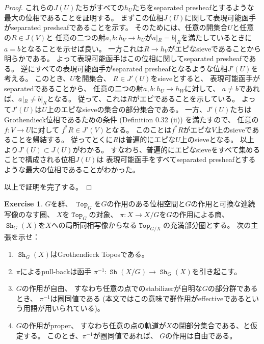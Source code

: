 \documentclass[uplatex]{jsarticle}
\theoremstyle{definition}
\newtheorem{prob}[prob]{Exercise}
\DeclareMathOperator{\sfTop}{\mathtt{Top}}
\DeclareMathOperator{\Sh}{\mathtt{Sh}}
\begin{document}
\begin{proof}
  これらの\(J(U)\)たちがすべての\(h_U\)たちをseparated presheafとするような
  最大の位相であることを証明する。
  まずこの位相\(J(U)\)に関して表現可能函手がseparated presheafであることを示す。
  そのためには、任意の開集合\(U\)と任意の\(R\in J(V)\)と
  任意の二つの射\(a,b:h_V\to h_U\)が\(a|_R = b|_R\)を満たしているときに
  \(a=b\)となることを示せば良い。
  一方これは\(R\to h_V\)がエピなsieveであることから明らかである。
  よって表現可能函手はこの位相に関してseparated presheafである。
  逆にすべての表現可能函手がseparated presheafとなるような位相\(J'(U)\)を考える。
  このとき、\(U\)を開集合、
  \(R\in J'(U)\)をsieveとすると、
  表現可能函手がseparatedであることから、
  任意の二つの射\(a,b:h_U\to h_W\)に対して、
  \(a\neq b\)であれば、\(a|_R\neq b|_R\)となる。
  従って、これは\(R\)がエピであることを示している。
  よって\(J'(U)\)は\(U\)上のエピなsieveの集合の部分集合である。
  一方、\(J'(U)\)たちは
  Grothendieck位相であるための条件 (Definition 0.32 (ii)) を満たすので、
  任意の\(f:V\to U\)に対して
  \(f^*R\in J'(V)\)となる。
  このことは\(f^*R\)がエピな\(V\)上のsieveであることを帰結する。
  従ってとくに\(R\)は普遍的にエピな\(U\)上のsieveとなる。
  以上より\(J'(U)\subset J(U)\)がわかる。
  すなわち、普遍的にエピなsieveをすべて集めることで構成される位相\(J(U)\)は
  表現可能函手をすべてseparated presheafとするような最大の位相であることがわかった。

  以上で証明を完了する。
\end{proof}




\begin{prob}\label{prob: 0.9}
  \(G\)を群、
  \(\sfTop_G\)を\(G\)の作用のある位相空間と\(G\)の作用と可換な連続写像のなす圏、
  \(X\)を\(\sfTop_G\)の対象、
  \(\pi:X\to X/G\)を\(G\)の作用による商、
  \(\Sh_G(X)\)を\(X\)への局所同相写像からなる\(\sfTop_{G/X}\)の充満部分圏とする。
  次の主張を示せ：
  \begin{enumerate}
    \item \label{enumi: prob: 0.9.1}
    \(\Sh_G(X)\)はGrothendieck Toposである。
    \item \label{enumi: prob: 0.9.2}
    \(\pi\)によるpull-backは函手
    \(\pi^{-1}: \Sh(X/G)\to \Sh_G(X)\)を引き起こす。
    \item \label{enumi: prob: 0.9.3}
    \(G\)の作用が自由、
    すなわち任意の点でのstabilizerが自明な\(G\)の部分群であるとき、
    \(\pi^{-1}\)は圏同値である
    (本文ではこの意味で群作用がeffectiveであるという用語が用いられている)。
    \item \label{enumi: prob: 0.9.4}
    \(G\)の作用がproper、
    すなわち任意の点の軌道が\(X\)の閉部分集合である、と仮定する。
    このとき、\(\pi^{-1}\)が圏同値であれば、
    \(G\)の作用は自由である。
  \end{enumerate}
\end{prob}
\end{document}
